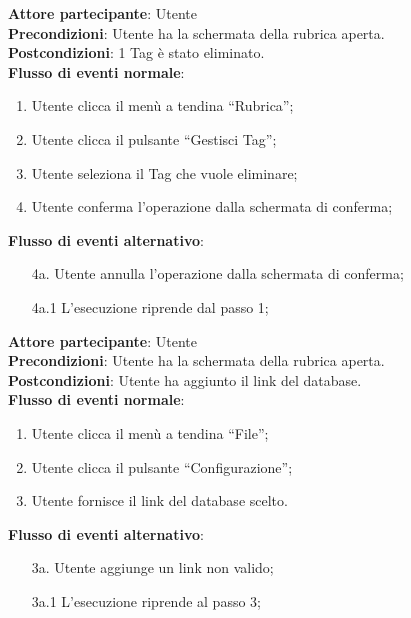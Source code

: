 \begin{tcolorbox}[colback=white,colframe=black!80!white,title=\textbf{C11 - Eliminare Tag}]
	\textbf{Attore partecipante}: Utente
	\\\textbf{Precondizioni}: Utente ha la schermata della rubrica aperta.
	\\\textbf{Postcondizioni}: 1 Tag è stato eliminato.
	\\\textbf{Flusso di eventi normale}:
	\begin{enumerate}[noitemsep, topsep=0pt]
		\item Utente clicca il menù a tendina “Rubrica”;
	\item	Utente clicca il pulsante “Gestisci Tag”;
	\item	Utente seleziona il Tag che vuole eliminare;
	\item	Utente conferma l’operazione dalla schermata di conferma;
	\end{enumerate}
	\textbf{Flusso di eventi alternativo}:
	\begin{itemize}[noitemsep, topsep=0pt]
		\item[4a. ] Utente annulla l’operazione dalla schermata di conferma;
		\item[4a.1] L’esecuzione riprende dal passo 1;		
	\end{itemize}
\end{tcolorbox}

\begin{tcolorbox}[colback=white,colframe=black!80!white,title=\textbf{C12 - Aggiungere configurazione database}]
	\textbf{Attore partecipante}: Utente
	\\\textbf{Precondizioni}: Utente ha la schermata della rubrica aperta.
	\\\textbf{Postcondizioni}: Utente ha aggiunto il link del database.
	\\\textbf{Flusso di eventi normale}:
	\begin{enumerate}[noitemsep, topsep=0pt]
		\item Utente clicca il menù a tendina “File”;
		\item Utente clicca il pulsante “Configurazione”;
		\item Utente fornisce il link del database scelto.		
	\end{enumerate}
	\textbf{Flusso di eventi alternativo}:
	\begin{itemize}[noitemsep, topsep=0pt]
		\item[3a. ] Utente aggiunge un link non valido;
		\item[3a.1] L’esecuzione riprende al passo 3;
	\end{itemize}
\end{tcolorbox}

